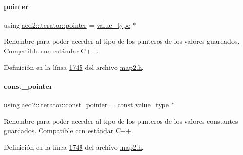 \paragraph{\texorpdfstring{pointer}{pointer}}
{\footnotesize\ttfamily using \hyperlink{classaed2_1_1iterator_a07466e8d020a80e2deb80364f28d4fa0_a07466e8d020a80e2deb80364f28d4fa0}{aed2\+::iterator\+::pointer} =  \hyperlink{classaed2_1_1iterator_a6411a2c08b2b7c52f063bef1a168acb6_a6411a2c08b2b7c52f063bef1a168acb6}{value\+\_\+type} $\ast$}



Renombre para poder acceder al tipo de los punteros de los valores guardados. Compatible con estándar C++. 



Definición en la línea \hyperlink{map2_8h_source_l01745}{1745} del archivo \hyperlink{map2_8h_source}{map2.\+h}.

\mbox{\label{classaed2_1_1iterator_afa70c9577ce04d4d7b84741fababc5ac_afa70c9577ce04d4d7b84741fababc5ac}} 
\paragraph{\texorpdfstring{const\+\_\+pointer}{const\_pointer}}
{\footnotesize\ttfamily using \hyperlink{classaed2_1_1iterator_afa70c9577ce04d4d7b84741fababc5ac_afa70c9577ce04d4d7b84741fababc5ac}{aed2\+::iterator\+::const\+\_\+pointer} =  const \hyperlink{classaed2_1_1iterator_a6411a2c08b2b7c52f063bef1a168acb6_a6411a2c08b2b7c52f063bef1a168acb6}{value\+\_\+type} $\ast$}



Renombre para poder acceder al tipo de los punteros de los valores constantes guardados. Compatible con estándar C++. 



Definición en la línea \hyperlink{map2_8h_source_l01749}{1749} del archivo \hyperlink{map2_8h_source}{map2.\+h}.

\mbox{\label{classaed2_1_1iterator_a0d460d3f76439cea3436e1113990be47_a0d460d3f76439cea3436e1113990be47}} 

